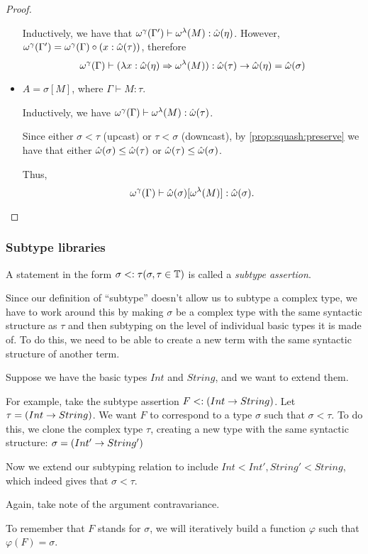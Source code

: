 \documentclass[main.tex]{subfiles}
\begin{document}
\begin{proof}
\begin{itemize}
            Inductively, we have that $\omega^{\gamma}(\Gamma') \vdash \omega^{\lambda}(M) : \hat{\omega}(\eta)$.
            However, $\omega^{\gamma}(\Gamma') = \omega^{\gamma}(\Gamma) \circ (x : \hat{\omega}(\tau))$,
            therefore \[ \omega^{\gamma}(\Gamma) \vdash (\lambda x : \hat{\omega}(\eta)
                \Rightarrow \omega^{\lambda}(M)) : \hat{\omega}(\tau) \rightarrow \hat{\omega}(\eta) = \hat{\omega}(\sigma) \]

        \item $A = \sigma[M]$, where $\Gamma \vdash M : \tau$.

            Inductively, we have $\omega^{\gamma}(\Gamma) \vdash \omega^{\lambda}(M) : \hat{\omega}(\tau)$.

            Since either $\sigma \less \tau$ (upcast) or $\tau \less \sigma$
            (downcast), by \cref{prop:squash:preserve} we have that either
            $\hat{\omega}(\sigma) \leq \hat{\omega}(\tau)$ or $\hat{\omega}(\tau) \leq \hat{\omega}(\sigma)$.

            Thus, \[
                \omega^{\gamma}(\Gamma) \vdash \hat{\omega}(\sigma)[\omega^{\lambda}(M)] : \hat{\omega}(\sigma).
            \]
    \end{itemize}
\end{proof}

\subsubsection{Subtype libraries}
\begin{defn}
    A statement in the form $\sigma <: \tau (\sigma, \tau \in \mathbb{T})$
    is called a \emph{subtype assertion}.
\end{defn}

Since our definition of ``subtype'' doesn't allow us to subtype a complex type,
we have to work around this by making $\sigma$ be a complex type with the same
syntactic structure as $\tau$ and then subtyping on the level of individual
basic types it is made of. To do this, we need to be able to create a new term
with the same syntactic structure of another term.

\begin{example}
    Suppose we have the basic types $Int$ and $String$, and we want to extend
    them.

    For example, take the subtype assertion $F <: ( Int \rightarrow String )$.
    Let $\tau = ( Int \rightarrow String )$. We want $F$ to correspond to a type
    $\sigma$ such that $\sigma \less \tau$. To do this, we clone
    the complex type $\tau$, creating a new type with the same
    syntactic structure: $\sigma = ( Int' \rightarrow String' )$

    Now we extend our subtyping relation to include $ Int \less Int', String' \less String $,
    which indeed gives that $\sigma \less \tau$.

    Again, take note of the argument contravariance.

    To remember that $F$ stands for $\sigma$, we will iteratively build a
    function $\varphi$ such that $\varphi(F) = \sigma$.
\end{example}
\end{document}
